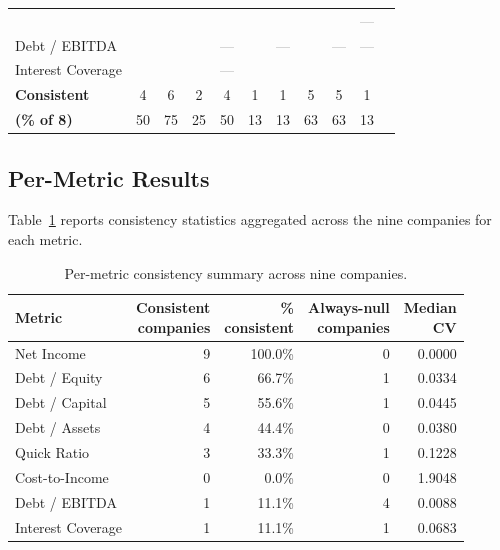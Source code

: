 \documentclass[12pt, a4paper]{article}
\newcommand{\cmark}{\textcolor{green!60!black}{\ding{51}}}  %
\newcommand{\xmark}{\textcolor{red!70!black}{\ding{55}}}    %
\newcommand{\nmark}{\textcolor{gray}{---}}                   %
\begin{document}
\begin{table}[H]
\begin{tabular}{lcccccccccc}
  & \cellcolor{consistent}\cmark & \cellcolor{consistent}\cmark
  & \cellcolor{variable}\xmark & \cellcolor{consistent}\cmark
  & \cellcolor{variable}\xmark & \cellcolor{variable}\xmark
  & \cellcolor{consistent}\cmark & \cellcolor{consistent}\cmark
  & \cellcolor{allnull}\nmark \\
Debt / EBITDA
  & \cellcolor{variable}\xmark & \cellcolor{consistent}\cmark
  & \cellcolor{variable}\xmark & \cellcolor{allnull}\nmark
  & \cellcolor{variable}\xmark & \cellcolor{allnull}\nmark
  & \cellcolor{variable}\xmark & \cellcolor{allnull}\nmark
  & \cellcolor{allnull}\nmark \\
Interest Coverage
  & \cellcolor{variable}\xmark & \cellcolor{variable}\xmark
  & \cellcolor{variable}\xmark & \cellcolor{allnull}\nmark
  & \cellcolor{variable}\xmark & \cellcolor{variable}\xmark
  & \cellcolor{variable}\xmark & \cellcolor{consistent}\cmark
  & \cellcolor{variable}\xmark \\
\midrule
\textbf{Consistent} & 4 & 6 & 2 & 4 & 1 & 1 & 5 & 5 & 1 \\
\textbf{(\% of 8)}  & 50 & 75 & 25 & 50 & 13 & 13 & 63 & 63 & 13 \\
\bottomrule
\end{tabular}
\end{table}

\subsection{Per-Metric Results}

Table~\ref{tab:metric-summary} reports consistency statistics aggregated
across the nine companies for each metric.

\begin{table}[H]
\centering
\caption{Per-metric consistency summary across nine companies.}
\label{tab:metric-summary}
\begin{tabular}{lrrrr}
\toprule
\textbf{Metric} &
  \makecell{\textbf{Consistent}\\\textbf{companies}} &
  \makecell{\textbf{\%}\\\textbf{consistent}} &
  \makecell{\textbf{Always-null}\\\textbf{companies}} &
  \makecell{\textbf{Median}\\\textbf{CV}} \\
\midrule
Net Income             & 9 & 100.0\% & 0 & 0.0000 \\
Debt / Equity          & 6 &  66.7\% & 1 & 0.0334 \\
Debt / Capital         & 5 &  55.6\% & 1 & 0.0445 \\
Debt / Assets          & 4 &  44.4\% & 0 & 0.0380 \\
Quick Ratio            & 3 &  33.3\% & 1 & 0.1228 \\
Cost-to-Income         & 0 &   0.0\% & 0 & 1.9048 \\
Debt / EBITDA          & 1 &  11.1\% & 4 & 0.0088 \\
Interest Coverage      & 1 &  11.1\% & 1 & 0.0683 \\
\bottomrule
\end{tabular}
\end{table}
\end{document}
